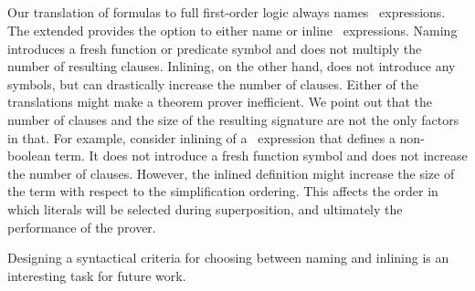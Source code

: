 %

\subsection{\LETIN}
Our translation of \folb{} formulas to full first-order logic always names \LETIN\ expressions. The extended \newcnf{} provides the option to either name or inline \LETIN\ expressions. Naming introduces a fresh function or predicate symbol and does not multiply the number of resulting clauses. Inlining, on the other hand, does not introduce any symbols, but can drastically increase the number of clauses. Either of the translations might make a theorem prover inefficient. We point out that the number of clauses and the size of the resulting signature are not the only factors in that. For example, consider inlining of a \LETIN\ expression that defines a non-boolean term. It does not introduce a fresh function symbol and does not increase the number of clauses. However, the inlined definition might increase the size of the term with respect to the simplification ordering. This affects the order in which literals will be selected during superposition, and ultimately the performance of the prover.

Designing a syntactical criteria for choosing between naming and inlining is an interesting task for future work.

